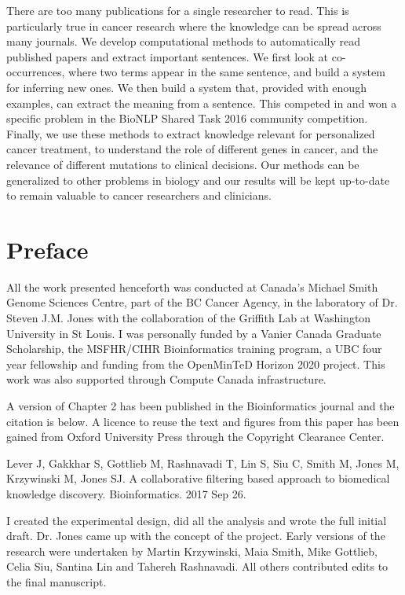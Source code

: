 There are too many publications for a single researcher to read. This is particularly true in cancer research where the knowledge can be spread across many journals. We develop computational methods to automatically read published papers and extract important sentences. We first look at co-occurrences, where two terms appear in the same sentence, and build a system for inferring new ones. We then build a system that, provided with enough examples, can extract the meaning from a sentence. This competed in and won a specific problem in the BioNLP Shared Task 2016 community competition. Finally, we use these methods to extract knowledge relevant for personalized cancer treatment, to understand the role of different genes in cancer, and the relevance of different mutations to clinical decisions. Our methods can be generalized to other problems in biology and our results will be kept up-to-date to remain valuable to cancer researchers and clinicians.

\chapter{Preface}

All the work presented henceforth was conducted at Canada’s Michael Smith Genome Sciences Centre, part of the BC Cancer Agency, in the laboratory of Dr. Steven J.M. Jones with the collaboration of the Griffith Lab at Washington University in St Louis. I was personally funded by a Vanier Canada Graduate Scholarship, the MSFHR/CIHR Bioinformatics training program, a UBC four year fellowship and funding from the OpenMinTeD Horizon 2020 project. This work was also supported through Compute Canada infrastructure.

A version of Chapter 2 has been published in the Bioinformatics journal and the citation is below. A licence to reuse the text and figures from this paper has been gained from Oxford University Press through the Copyright Clearance Center.

Lever J, Gakkhar S, Gottlieb M, Rashnavadi T, Lin S, Siu C, Smith M, Jones M, Krzywinski M, Jones SJ. A collaborative filtering based approach to biomedical knowledge discovery. Bioinformatics. 2017 Sep 26.

I created the experimental design, did all the analysis and wrote the full initial draft. Dr. Jones came up with the concept of the project. Early versions of the research were undertaken by Martin Krzywinski, Maia Smith, Mike Gottlieb, Celia Siu, Santina Lin and Tahereh Rashnavadi. All others contributed edits to the final manuscript.

